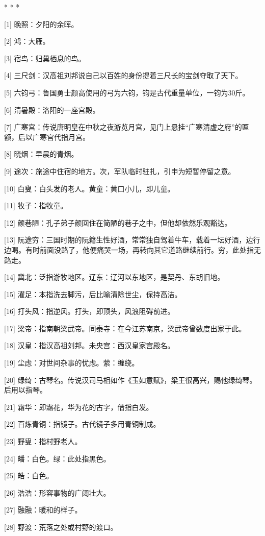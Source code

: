 \documentclass[12pt,UTF8]{ctexbook}
\begin{document}
* * *



[1] 晚照：夕阳的余晖。

[2] 鸿：大雁。

[3] 宿鸟：归巢栖息的鸟。

[4] 三尺剑：汉高祖刘邦说自己以百姓的身份提着三尺长的宝剑夺取了天下。

[5] 六钧弓：鲁国勇士颜高使用的弓为六钧，钧是古代重量单位，一钧为30斤。

[6] 清暑殿：洛阳的一座宫殿。

[7] 广寒宫：传说唐明皇在中秋之夜游览月宫，见门上悬挂“广寒清虚之府”的匾额，后以广寒宫代指月宫。

[8] 晓烟：早晨的青烟。

[9] 途次：旅途中住宿的地方。次，军队临时驻扎，引申为短暂停留之意。

[10] 白叟：白头发的老人。黄童：黄口小儿，即儿童。

[11] 牧子：指牧童。

[12] 颜巷陋：孔子弟子颜回住在简陋的巷子之中，但他却依然乐观豁达。

[13] 阮途穷：三国时期的阮籍生性好酒，常常独自驾着牛车，载着一坛好酒，边行边喝。有时前面没路了，他便痛哭一场，再转向其它道路继续前行。穷，此处指无路走。

[14] 冀北：泛指游牧地区。辽东：辽河以东地区，是契丹、东胡旧地。

[15] 濯足：本指洗去脚污，后比喻清除世尘，保持高洁。

[16] 打头风：指逆风。打头，即顶头，风浪阻碍前进。

[17] 梁帝：指南朝梁武帝。同泰寺：在今江苏南京，梁武帝曾数度出家于此。

[18] 汉皇：指汉高祖刘邦。未央宫：西汉皇家宫殿名。

[19] 尘虑：对世间杂事的忧虑。萦：缠绕。

[20] 绿绮：古琴名。传说汉司马相如作《玉如意赋》，梁王很高兴，赐他绿绮琴。后用以指琴。

[21] 霜华：即霜花，华为花的古字，借指白发。

[22] 百炼青铜：指镜子。古代镜子多用青铜制成。

[23] 野叟：指村野老人。

[24] 皤：白色。绿：此处指黑色。

[25] 皓：白色。

[26] 浩浩：形容事物的广阔壮大。

[27] 融融：暖和的样子。

[28] 野渡：荒落之处或村野的渡口。
\end{document}
